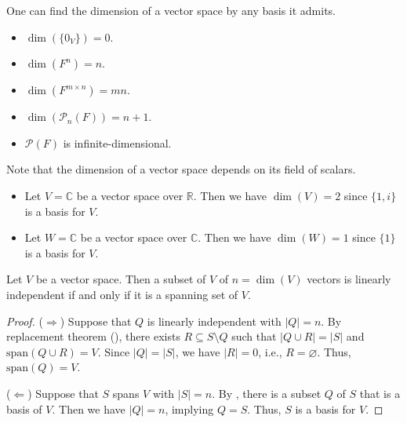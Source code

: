 \begin{examples}
  One can find the dimension of a vector space by any basis it admits.
  \begin{itemize}
    \item $\dim(\{0_V\}) = 0$.
    \item $\dim(F^n) = n$.
    \item $\dim(F^{m \times n}) = mn$.
    \item $\dim(\mathcal{P}_n(F)) = n + 1$.
    \item $\mathcal{P}(F)$ is infinite-dimensional.
  \end{itemize}
\end{examples}

\begin{examples}
  Note that the dimension of a vector space depends on its field of scalars.
  \begin{itemize}
    \item Let $V = \mathbb{C}$ be a vector space over $\mathbb{R}$.
      Then we have $\dim(V) = 2$ since $\{1, i\}$ is a basis for $V$.
    \item Let $W = \mathbb{C}$ be a vector space over $\mathbb{C}$.
      Then we have $\dim(W) = 1$ since $\{1\}$ is a basis for $V$.
  \end{itemize}
\end{examples}

\begin{proposition}\label{prop:basis-equivalence}
  Let $V$ be a vector space.
  Then a subset of $V$ of $n = \dim(V)$ vectors is linearly
  independent if and only if it is a spanning set of $V$.
\end{proposition}
\begin{proof}
  ($\Rightarrow$) Suppose that $Q$ is linearly independent with $|Q| = n$.
  By replacement theorem (), there exists
  $R \subseteq S \setminus Q$ such that $|Q \cup R| = |S|$ and
  $\mathrm{span}(Q \cup R) = V$.
  Since $|Q| = |S|$, we have $|R| = 0$, i.e., $R = \varnothing$.
  Thus, $\mathrm{span}(Q) = V$.

  ($\Leftarrow$) Suppose that $S$ spans $V$ with $|S| = n$.
  By , there is a subset $Q$ of $S$
  that is a basis of $V$.
  Then we have $|Q| = n$, implying $Q = S$.
  Thus, $S$ is a basis for $V$.
\end{proof}

